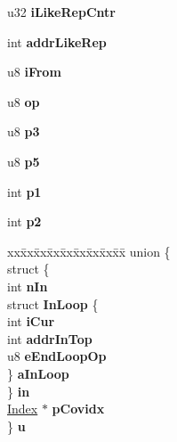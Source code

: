 \begin{DoxyCompactItemize}
\item 
u32 {\bfseries i\+Like\+Rep\+Cntr}\hypertarget{structWhereLevel_ae1e65eb45261ec73581714758d9b73ac}{}\label{structWhereLevel_ae1e65eb45261ec73581714758d9b73ac}

\item 
int {\bfseries addr\+Like\+Rep}\hypertarget{structWhereLevel_a903c5abe2bf15929b51a1d0921782531}{}\label{structWhereLevel_a903c5abe2bf15929b51a1d0921782531}

\item 
u8 {\bfseries i\+From}\hypertarget{structWhereLevel_a4d8e905640b12a5075ff5e2f395876dd}{}\label{structWhereLevel_a4d8e905640b12a5075ff5e2f395876dd}

\item 
u8 {\bfseries op}\hypertarget{structWhereLevel_a0253c213b81cd17481601e495d421706}{}\label{structWhereLevel_a0253c213b81cd17481601e495d421706}

\item 
u8 {\bfseries p3}\hypertarget{structWhereLevel_a350b6471be36b98926c357c75658865f}{}\label{structWhereLevel_a350b6471be36b98926c357c75658865f}

\item 
u8 {\bfseries p5}\hypertarget{structWhereLevel_a568ee11c7ecabb4259836ccc11025ae6}{}\label{structWhereLevel_a568ee11c7ecabb4259836ccc11025ae6}

\item 
int {\bfseries p1}\hypertarget{structWhereLevel_ad544492b3388cb82a4b3674e6c1fdb07}{}\label{structWhereLevel_ad544492b3388cb82a4b3674e6c1fdb07}

\item 
int {\bfseries p2}\hypertarget{structWhereLevel_a9c60432a75f2252764e78128e4dad19b}{}\label{structWhereLevel_a9c60432a75f2252764e78128e4dad19b}

\item 
\begin{tabbing}
xx\=xx\=xx\=xx\=xx\=xx\=xx\=xx\=xx\=\kill
union \{\\
\>struct \{\\
\>\>int {\bfseries nIn}\\
\>\>struct {\bfseries InLoop} \{\\
\>\>\>int {\bfseries iCur}\\
\>\>\>int {\bfseries addrInTop}\\
\>\>\>u8 {\bfseries eEndLoopOp}\\
\>\>\} {\bfseries aInLoop}\\
\>\} {\bfseries in}\\
\>\hyperlink{structIndex}{Index} $\ast$ {\bfseries pCovidx}\\
\} {\bfseries u}\hypertarget{structWhereLevel_abad390f24feceb6cf35799d658ab68e4}{}\label{structWhereLevel_abad390f24feceb6cf35799d658ab68e4}
\\


\end{tabbing}
\end{DoxyCompactItemize}
